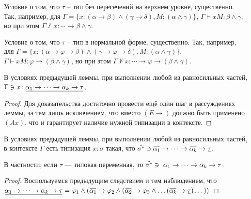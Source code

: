 \documentclass[../main.tex]{subfiles}
\begin{document}
\begin{notice}
    Условие о том, что $\tau$ -- тип без пересечений на верхнем уровне, существенно. Так, например, для $\Gamma = \{x \colon (\alpha \to \beta) \wedge (\gamma \to \delta), M \colon (\alpha \wedge \gamma)  \}$, $\Gamma \vdash xM \colon \beta \wedge \gamma$, но при этом $\Gamma \nvdash x \colon \cdots \to \beta \wedge \gamma$.
\end{notice}

\begin{notice}
    Условие о том, что $\tau$ -- тип в нормальной форме, существенно. Так, например, для $\Gamma = \{x \colon (\alpha \to \varphi \to \beta) \wedge (\gamma \to \varphi \to \delta), M \colon (\alpha \wedge \gamma)  \}$, $\Gamma \vdash xM \colon \varphi \to (\beta \wedge \gamma)$, но при этом $\Gamma \nvdash x \colon \cdots \to \varphi \to (\beta \wedge \gamma)$.
\end{notice}

\begin{corollary} \label{в контексте} 
    В условиях предыдущей леммы, при выполнении любой из равносильных частей, $\Gamma \ni x \colon \ub{\alpha_1 \to \cdots \to \alpha_k \to \tau}$,
\end{corollary}

\begin{proof}
Для доказательства достаточно провести ещё один шаг в рассуждениях леммы, за тем лишь исключением, что вместо $(E \to)$ должно быть применено $(Ax)$, что и гарантирует наличие нужной типизации в контексте.
\end{proof}

\begin{corollary} \label{в контексте при разложении}
    В условиях предыдущей леммы, при выполнении любой из равносильных частей, в контексте $\Gamma$ есть типизация $x \colon \sigma$ такая, что $\hat{\sigma^*} \ni \ob{\alpha_1} \to \cdots \to \ob{\alpha_k} \to \ub{\tau}$.
    
    В частности, если $\tau$ --- типовая переменная, то $\hat{\sigma^*} \ni \ \ob{\alpha_1} \to \cdots \to \ob{\alpha_k}  \to \tau$.
\end{corollary}
\begin{proof}
    Воспользуемся предыдущим следствием и тем наблюдением, что 
    $\ub{\alpha_1 \to \cdots \to \alpha_k \to \tau} = \varphi_1 \wedge (\ob{\alpha_1} \to \varphi_2 \wedge (\ob{\alpha_2} \to \varphi_3 \wedge \dots(\ob{\alpha_k} \to  \ub{\tau})\dots))$
\end{proof}
\end{document}
